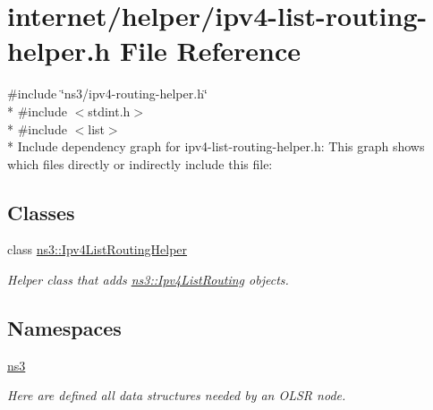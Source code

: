\hypertarget{ipv4-list-routing-helper_8h}{}\section{internet/helper/ipv4-\/list-\/routing-\/helper.h File Reference}
\label{ipv4-list-routing-helper_8h}
{\ttfamily \#include \char`\"{}ns3/ipv4-\/routing-\/helper.\+h\char`\"{}}\\*
{\ttfamily \#include $<$stdint.\+h$>$}\\*
{\ttfamily \#include $<$list$>$}\\*
Include dependency graph for ipv4-\/list-\/routing-\/helper.h\+:
This graph shows which files directly or indirectly include this file\+:
\subsection*{Classes}
\begin{DoxyCompactItemize}
\item 
class \hyperlink{classns3_1_1Ipv4ListRoutingHelper}{ns3\+::\+Ipv4\+List\+Routing\+Helper}
\begin{DoxyCompactList}\small\item\em Helper class that adds \hyperlink{classns3_1_1Ipv4ListRouting}{ns3\+::\+Ipv4\+List\+Routing} objects. \end{DoxyCompactList}\end{DoxyCompactItemize}
\subsection*{Namespaces}
\begin{DoxyCompactItemize}
\item 
 \hyperlink{namespacens3}{ns3}
\begin{DoxyCompactList}\small\item\em Here are defined all data structures needed by an O\+L\+SR node. \end{DoxyCompactList}\end{DoxyCompactItemize}

